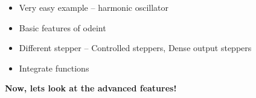 \begin{frame}
 

 \vspace{2ex}
 \begin{itemize}
  \item Very easy example -- harmonic oscillator
  \item Basic features of odeint
  \item Different stepper -- Controlled steppers, Dense output steppers
  \item Integrate functions
 \end{itemize}

 \vspace{2ex}

 \pause
 \centerline{\bf Now, lets look at the advanced features!}

\end{frame}



